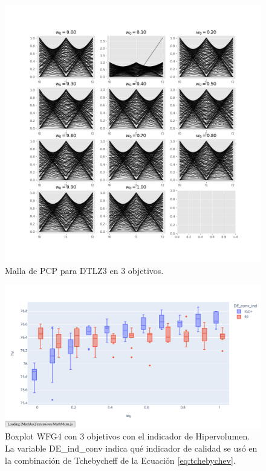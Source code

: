 \begin{figure} [H]
    \centering
    \includegraphics[width=\textwidth]{Figuras/DTLZ3_obj_3_alg_IGD+_indmed_HV_malla._PCP.pdf}
    \caption[Malla de PCP  de aproximaciones al PF.]{Malla de PCP para DTLZ3 en 3 objetivos.}
    \label{fig:PCP}
\end{figure}



\begin{figure} [H]
    \centering
    \includegraphics[width=\textwidth]{Figuras/WFG4_3obj_HV.pdf}
    \caption[Boxplot WFG4 3 Objetivos HV.]{Boxplot WFG4 con 3 objetivos con el indicador de Hipervolumen. La variable DE\_ind\_conv indica qué indicador de calidad se usó en la combinación de Tchebycheff de la Ecuación \eqref{eq:tchebychev}.}
    \label{fig:box}
\end{figure}




